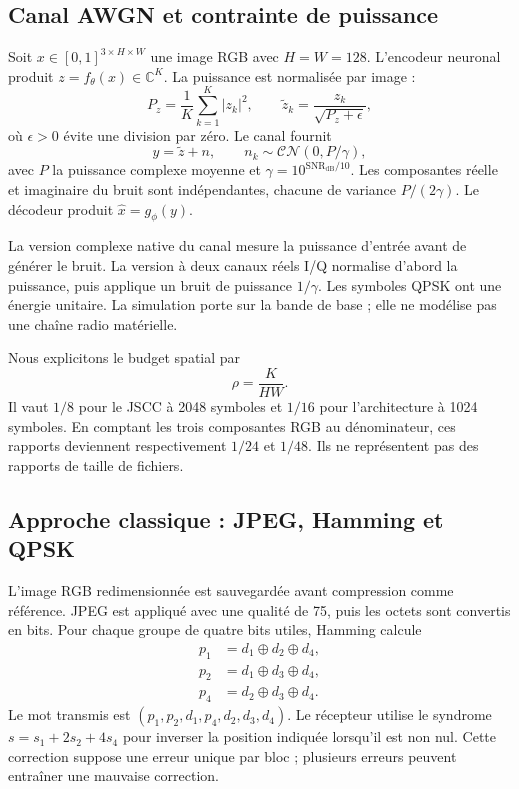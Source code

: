 \documentclass[conference]{IEEEtran}
\begin{document}
\subsection{Canal AWGN et contrainte de puissance}
Soit $x\in[0,1]^{3\times H\times W}$ une image RGB avec $H=W=128$.
L'encodeur neuronal produit $z=f_{\theta}(x)\in\mathbb C^K$.
La puissance est normalisée par image :
\begin{equation}
P_z=\frac1K\sum_{k=1}^{K}|z_k|^2,\qquad
\widetilde z_k=\frac{z_k}{\sqrt{P_z+\epsilon}},
\label{eq:power}
\end{equation}
où $\epsilon>0$ évite une division par zéro. Le canal fournit
\begin{equation}
y=\widetilde z+n,\qquad n_k\sim\mathcal{CN}(0,P/\gamma),
\label{eq:awgn}
\end{equation}
avec $P$ la puissance complexe moyenne et
$\gamma=10^{\mathrm{SNR}_{\mathrm{dB}}/10}$. Les composantes réelle
et imaginaire du bruit sont indépendantes, chacune de variance
$P/(2\gamma)$. Le décodeur produit $\widehat x=g_{\phi}(y)$.

La version complexe native du canal mesure la puissance d'entrée avant
de générer le bruit. La version à deux canaux réels I/Q normalise
d'abord la puissance, puis applique un bruit de puissance $1/\gamma$.
Les symboles QPSK ont une énergie unitaire. La simulation porte sur
la bande de base ; elle ne modélise pas une chaîne radio matérielle.

Nous explicitons le budget spatial par
\begin{equation}
\rho=\frac{K}{HW}.
\end{equation}
Il vaut $1/8$ pour le JSCC à 2048 symboles et $1/16$ pour
l'architecture à 1024 symboles. En comptant les trois composantes RGB
au dénominateur, ces rapports deviennent respectivement $1/24$ et
$1/48$. Ils ne représentent pas des rapports de taille de fichiers.

\subsection{Approche classique : JPEG, Hamming et QPSK}
L'image RGB redimensionnée est sauvegardée avant compression comme
référence. JPEG est appliqué avec une qualité de 75, puis les octets
sont convertis en bits. Pour chaque groupe de quatre bits utiles,
Hamming calcule
\begin{align}
p_1&=d_1\oplus d_2\oplus d_4,\\
p_2&=d_1\oplus d_3\oplus d_4,\\
p_4&=d_2\oplus d_3\oplus d_4.
\end{align}
Le mot transmis est $(p_1,p_2,d_1,p_4,d_2,d_3,d_4)$. Le récepteur
utilise le syndrome $s=s_1+2s_2+4s_4$ pour inverser la position
indiquée lorsqu'il est non nul. Cette correction suppose une erreur
unique par bloc ; plusieurs erreurs peuvent entraîner une mauvaise
correction.
\end{document}
